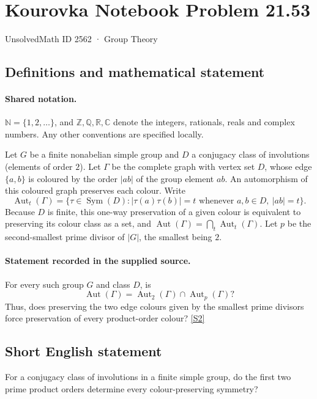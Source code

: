 \documentclass[11pt]{article}
\newcommand{\sref}[2]{\hyperlink{source:#1:#2}{[S#2]}}
\begin{document}
\setcounter{section}{2561}
\section{Kourovka Notebook Problem 21.53}\label{2562}
{\small\sffamily UnsolvedMath ID 2562 · Group Theory}
\subsection{Definitions and mathematical statement}

\paragraph{Shared notation.}$\mathbb N=\{1,2,\ldots\}$, and $\mathbb Z,\mathbb Q,\mathbb R,\mathbb C$ denote the integers, rationals, reals and complex numbers. Any other conventions are specified locally.


Let $G$ be a finite nonabelian simple group and $D$ a conjugacy class of involutions (elements of order $2$). Let $\Gamma$ be the complete graph with vertex set $D$, whose edge $\{a,b\}$ is coloured by the order $|ab|$ of the group element $ab$. An automorphism of this coloured graph preserves each colour. Write
\[
 \operatorname{Aut}_t(\Gamma)=\{\tau\in\operatorname{Sym}(D): |\tau(a)\tau(b)|=t\text{ whenever }a,b\in D,\ |ab|=t\}.
\]
Because $D$ is finite, this one-way preservation of a given colour is equivalent to preserving its colour class as a set, and $\operatorname{Aut}(\Gamma)=\bigcap_t\operatorname{Aut}_t(\Gamma)$. Let $p$ be the second-smallest prime divisor of $|G|$, the smallest being $2$.
\paragraph{Statement recorded in the supplied source.}
For every such group $G$ and class $D$, is
\[
 \operatorname{Aut}(\Gamma)=\operatorname{Aut}_2(\Gamma)\cap\operatorname{Aut}_p(\Gamma)?
\]
Thus, does preserving the two edge colours given by the smallest prime divisors force preservation of every product-order colour? \sref{2562}{2}
\subsection{Short English statement}
For a conjugacy class of involutions in a finite simple group, do the first two prime product orders determine every colour-preserving symmetry?
\end{document}
